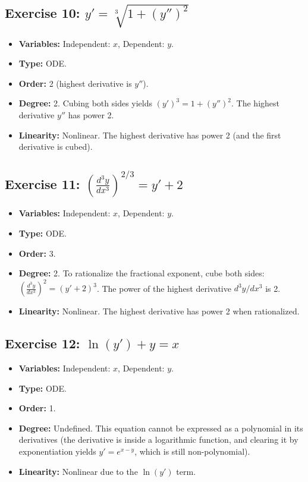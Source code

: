 \documentclass[11pt,letterpaper]{article}
\begin{document}
\subsection*{Exercise 10: $y' = \sqrt[3]{1 + (y'')^2}$}
\begin{itemize}
    \item \textbf{Variables:} Independent: $x$, Dependent: $y$.
    \item \textbf{Type:} ODE.
    \item \textbf{Order:} 2 (highest derivative is $y''$).
    \item \textbf{Degree:} 2. Cubing both sides yields $(y')^3 = 1 + (y'')^2$. The highest derivative $y''$ has power 2.
    \item \textbf{Linearity:} Nonlinear. The highest derivative has power 2 (and the first derivative is cubed).
\end{itemize}

\subsection*{Exercise 11: $\left(\frac{d^3 y}{dx^3}\right)^{2/3} = y' + 2$}
\begin{itemize}
    \item \textbf{Variables:} Independent: $x$, Dependent: $y$.
    \item \textbf{Type:} ODE.
    \item \textbf{Order:} 3.
    \item \textbf{Degree:} 2. To rationalize the fractional exponent, cube both sides: $\left(\frac{d^3 y}{dx^3}\right)^2 = (y' + 2)^3$. The power of the highest derivative $d^3y/dx^3$ is 2.
    \item \textbf{Linearity:} Nonlinear. The highest derivative has power 2 when rationalized.
\end{itemize}

\subsection*{Exercise 12: $\ln(y') + y = x$}
\begin{itemize}
    \item \textbf{Variables:} Independent: $x$, Dependent: $y$.
    \item \textbf{Type:} ODE.
    \item \textbf{Order:} 1.
    \item \textbf{Degree:} Undefined. This equation cannot be expressed as a polynomial in its derivatives (the derivative is inside a logarithmic function, and clearing it by exponentiation yields $y' = e^{x-y}$, which is still non-polynomial).
    \item \textbf{Linearity:} Nonlinear due to the $\ln(y')$ term.
\end{itemize}
\end{document}
